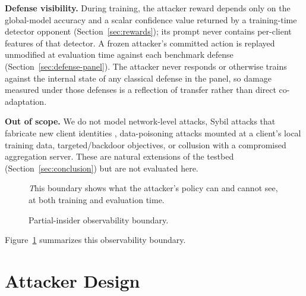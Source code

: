 \documentclass[conference,9pt]{IEEEtran}
\begin{document}
\textbf{Defense visibility.} During training, the attacker reward depends only on the global-model accuracy and a scalar confidence value returned by a training-time detector opponent (Section~\ref{sec:rewards}); its prompt never contains per-client features of that detector. A frozen attacker’s committed action is replayed unmodified at evaluation time against each benchmark defense (Section~\ref{sec:defense-panel}). The attacker never responds or otherwise trains against the internal state of any classical defense in the panel, so damage measured under those defenses is a reflection of transfer rather than direct co-adaptation.

\textbf{Out of scope.} We do not model network-level attacks, Sybil attacks that fabricate new client identities \cite{cao2022mpaf}, data-poisoning attacks mounted at a client's local training data, targeted/backdoor objectives, or collusion with a compromised aggregation server. These are natural extensions of the testbed (Section~\ref{sec:conclusion}) but are not evaluated here.

\begin{figure}[t]
\centering
{}
\caption{Partial-insider observability boundary.}
\vspace{2mm}
\small \textit This boundary shows what the attacker's policy can and cannot see, at both training and evaluation time.
\label{fig:threatmodel}
\end{figure}
Figure~\ref{fig:threatmodel} summarizes this observability boundary.

\section{Attacker Design}
\label{sec:attack}
\end{document}
